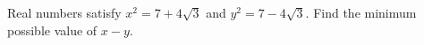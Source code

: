 Real numbers satisfy $ x^2=7+4\sqrt3 $ and $ y^2=7-4\sqrt3 $. Find the minimum possible value of $ x-y $.
